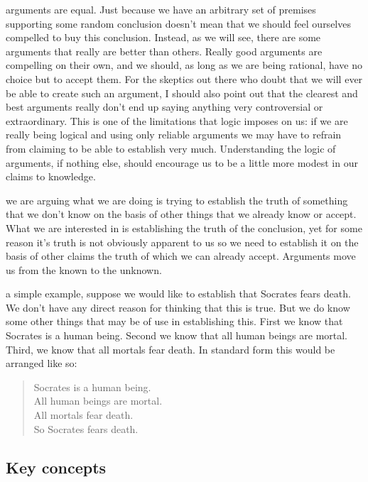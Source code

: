 \documentclass[justified]{tufte-book}
\newenvironment{argument}{\begin{quote}\normalsize}{\end{quote}}
\begin{document}
 arguments are equal. Just because we have an arbitrary set of premises supporting some random conclusion doesn't mean that we should feel ourselves compelled to buy this conclusion. Instead, as we will see, there are some arguments that really are better than others. Really good arguments are compelling on their own, and we should, as long as we are being rational, have no choice but to accept them. For the skeptics out there who doubt that we will ever be able to create such an argument, I should also point out that the clearest and best arguments really don't end up saying anything very controversial or extraordinary. This is one of the limitations that logic imposes on us: if we are really being logical and using only reliable arguments we may have to refrain from claiming to be able to establish very much. Understanding the logic of arguments, if nothing else, should encourage us to be a little more modest in our claims to knowledge.

 we are arguing what we are doing is trying to establish the truth of something that we don't know on the basis of other things that we already know or accept. What we are interested in is establishing the truth of the conclusion, yet for some reason it's truth is not obviously apparent to us so we need to establish it on the basis of other claims the truth of which we can already accept. Arguments move us from the known to the unknown.

 a simple example, suppose we would like to establish that Socrates fears death. We don't have any direct reason for thinking that this is true. But we do know some other things that may be of use in establishing this. First we know that Socrates is a human being. Second we know that all human beings are mortal. Third, we know that all mortals fear death. In standard form this would be arranged like so:

\begin{argument}
Socrates is a human being.\\
All human beings are mortal.\\
All mortals fear death.\\

So Socrates fears death.
\end{argument}

\hypertarget{key-concepts}{%
\subsection*{Key concepts}\label{key-concepts}}
\end{document}

